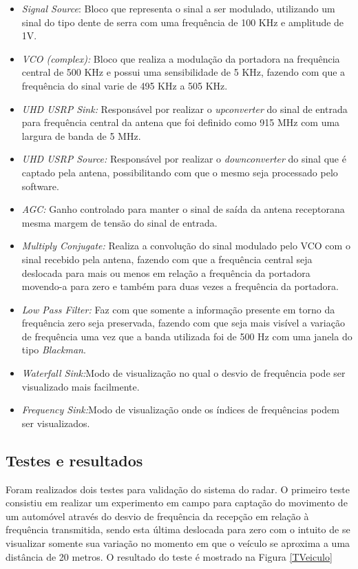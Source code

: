 \begin{itemize}
    \item \emph{Signal Source}: Bloco que representa o sinal a ser modulado, utilizando um sinal do tipo dente de serra com uma frequência de 100 KHz e amplitude de 1V.
    \item \emph{VCO (complex):} Bloco que realiza a modulação da portadora na frequência central de 500 KHz e possui uma sensibilidade de 5 KHz, fazendo com que a frequência do sinal varie de 495 KHz a 505 KHz.
    \item \emph{UHD USRP Sink:}  Responsável por realizar o \emph{upconverter} do sinal de entrada para frequência central da antena que foi definido como 915 MHz com uma largura de banda de 5 MHz.
    \item \emph{UHD USRP Source:} Responsável por realizar o \emph{downconverter} do sinal que é captado pela antena, possibilitando com que o mesmo seja processado pelo software.
    \item \emph{AGC:} Ganho controlado para manter o sinal de saída da antena receptorana mesma margem de tensão do sinal de entrada.
    \item \emph{Multiply Conjugate:} Realiza a convolução do sinal modulado pelo VCO com o sinal recebido pela antena, fazendo com que a frequência central seja deslocada para mais ou menos em relação a frequência da portadora movendo-a para zero e também para duas vezes a frequência da portadora.
    \item\emph{Low Pass Filter:} Faz com que somente a informação presente em torno da frequência zero seja preservada, fazendo com que seja mais visível a variação de frequência uma vez que a banda utilizada foi de 500 Hz com uma janela do tipo \emph{Blackman}.
    \item \emph{Waterfall Sink:}Modo de visualização no qual o desvio de frequência pode ser visualizado mais facilmente.
    \item \emph{Frequency Sink:}Modo de visualização onde os índices de frequências podem ser visualizados.
\end{itemize} 

\subsection{Testes e resultados}

    Foram realizados dois testes para validação do sistema do radar. O primeiro teste consistiu em realizar um experimento em campo para captação do movimento de um automóvel através do desvio de frequência da recepção em relação à frequência transmitida, sendo esta última deslocada para zero com o intuito de se visualizar somente sua variação no momento em que o veículo se aproxima a uma distância de 20 metros. O resultado do teste é mostrado na Figura \ref{TVeiculo}

